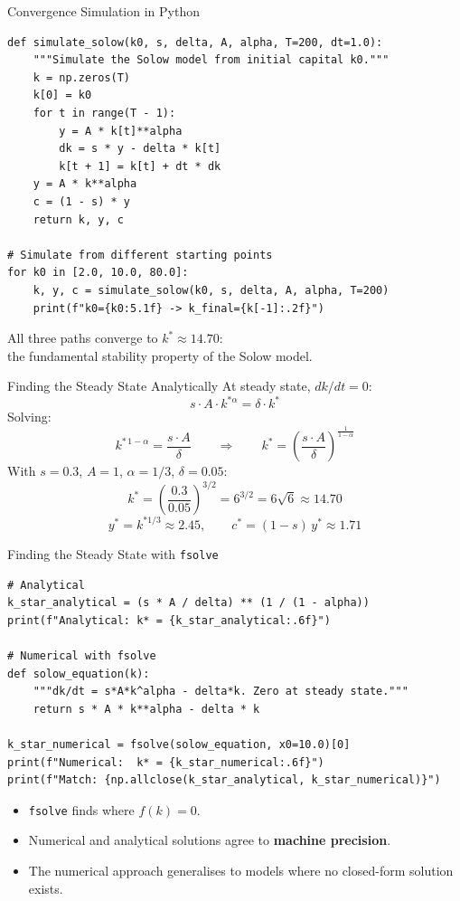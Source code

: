 \documentclass[aspectratio=169, 10pt]{beamer}
\begin{document}
\begin{frame}[fragile]{Convergence Simulation in Python}
\begin{lstlisting}
def simulate_solow(k0, s, delta, A, alpha, T=200, dt=1.0):
    """Simulate the Solow model from initial capital k0."""
    k = np.zeros(T)
    k[0] = k0
    for t in range(T - 1):
        y = A * k[t]**alpha
        dk = s * y - delta * k[t]
        k[t + 1] = k[t] + dt * dk
    y = A * k**alpha
    c = (1 - s) * y
    return k, y, c

# Simulate from different starting points
for k0 in [2.0, 10.0, 80.0]:
    k, y, c = simulate_solow(k0, s, delta, A, alpha, T=200)
    print(f"k0={k0:5.1f} -> k_final={k[-1]:.2f}")
\end{lstlisting}
\vspace{0.3em}
All three paths converge to $k^* \approx 14.70$:\\
the \alert{fundamental stability property} of the Solow model.
\end{frame}

\begin{frame}{Finding the Steady State Analytically}
At steady state, $dk/dt = 0$:
\[
  s \cdot A \cdot k^{*\alpha} = \delta \cdot k^*
\]
Solving:
\[
  k^{*\,1-\alpha} = \frac{s \cdot A}{\delta}
  \qquad\Longrightarrow\qquad
  \boxed{k^* = \left(\frac{s \cdot A}{\delta}\right)^{\!\frac{1}{1-\alpha}}}
\]
With $s = 0.3$, $A = 1$, $\alpha = 1/3$, $\delta = 0.05$:
\[
  k^* = \left(\frac{0.3}{0.05}\right)^{3/2}
      = 6^{3/2} = 6\sqrt{6} \approx 14.70
\]
\[
  y^* = k^{*1/3} \approx 2.45, \qquad
  c^* = (1-s)\,y^* \approx 1.71
\]
\end{frame}

\begin{frame}[fragile]{Finding the Steady State with \texttt{fsolve}}
\begin{lstlisting}
# Analytical
k_star_analytical = (s * A / delta) ** (1 / (1 - alpha))
print(f"Analytical: k* = {k_star_analytical:.6f}")

# Numerical with fsolve
def solow_equation(k):
    """dk/dt = s*A*k^alpha - delta*k. Zero at steady state."""
    return s * A * k**alpha - delta * k

k_star_numerical = fsolve(solow_equation, x0=10.0)[0]
print(f"Numerical:  k* = {k_star_numerical:.6f}")
print(f"Match: {np.allclose(k_star_analytical, k_star_numerical)}")
\end{lstlisting}
\vspace{0.3em}
\begin{itemize}
  \item \texttt{fsolve} finds where $f(k) = 0$.
  \item Numerical and analytical solutions agree to \textbf{machine precision}.
  \item The numerical approach generalises to models where
        no closed-form solution exists.
\end{itemize}
\end{frame}
\end{document}
